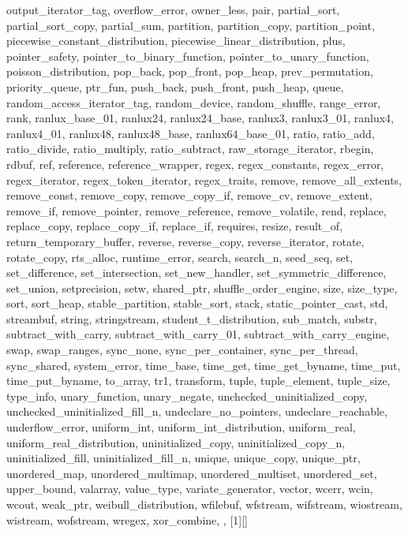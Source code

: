 {{output\_iterator\_tag, overflow\_error, owner\_less, pair, partial\_sort, partial\_sort\_copy, partial\_sum, partition, partition\_copy, partition\_point, piecewise\_constant\_distribution, piecewise\_linear\_distribution, plus, pointer\_safety, pointer\_to\_binary\_function, pointer\_to\_unary\_function, poisson\_distribution, pop\_back, pop\_front, pop\_heap, prev\_permutation, priority\_queue, ptr\_fun, push\_back, push\_front, push\_heap, queue, random\_access\_iterator\_tag, random\_device, random\_shuffle, range\_error, rank, ranlux\_base\_01, ranlux24, ranlux24\_base, ranlux3, ranlux3\_01, ranlux4, ranlux4\_01, ranlux48, ranlux48\_base, ranlux64\_base\_01, ratio, ratio\_add, ratio\_divide, ratio\_multiply, ratio\_subtract, raw\_storage\_iterator, rbegin, rdbuf, ref, reference, reference\_wrapper, regex, regex\_constants, regex\_error, regex\_iterator, regex\_token\_iterator, regex\_traits, remove, remove\_all\_extents, remove\_const, remove\_copy, remove\_copy\_if, remove\_cv, remove\_extent, remove\_if, remove\_pointer, remove\_reference, remove\_volatile, rend, replace, replace\_copy, replace\_copy\_if, replace\_if, requires, resize, result\_of, return\_temporary\_buffer, reverse, reverse\_copy, reverse\_iterator, rotate, rotate\_copy, rts\_alloc, runtime\_error, search, search\_n, seed\_seq, set, set\_difference, set\_intersection, set\_new\_handler, set\_symmetric\_difference, set\_union, setprecision, setw, shared\_ptr, shuffle\_order\_engine, size, size\_type, sort, sort\_heap, stable\_partition, stable\_sort, stack, static\_pointer\_cast, std, streambuf, string, stringstream, student\_t\_distribution, sub\_match, substr, subtract\_with\_carry, subtract\_with\_carry\_01, subtract\_with\_carry\_engine, swap, swap\_ranges, sync\_none, sync\_per\_container, sync\_per\_thread, sync\_shared, system\_error, time\_base, time\_get, time\_get\_byname, time\_put, time\_put\_byname, to\_array, tr1, transform, tuple, tuple\_element, tuple\_size, type\_info, unary\_function, unary\_negate, unchecked\_uninitialized\_copy, unchecked\_uninitialized\_fill\_n, undeclare\_no\_pointers, undeclare\_reachable, underflow\_error, uniform\_int, uniform\_int\_distribution, uniform\_real, uniform\_real\_distribution, uninitialized\_copy, uninitialized\_copy\_n, uninitialized\_fill, uninitialized\_fill\_n, unique, unique\_copy, unique\_ptr, unordered\_map, unordered\_multimap, unordered\_multiset, unordered\_set, upper\_bound, valarray, value\_type, variate\_generator, vector, wcerr, wcin, wcout, weak\_ptr, weibull\_distribution, wfilebuf, wfstream, wifstream, wiostream, wistream, wofstream, wregex, xor\_combine,
	},
}
\renewcommand\lstlistingname{Sample Code}
\newcommand{\inline}[2][black]{{\color{#1}\ttfamily{#2}}}
\newcommand{\Cinline}[1]{\lstinline
[style=bw, language = cppcodeblocks, keepspaces=true] {#1}}
[1][]{}{}

